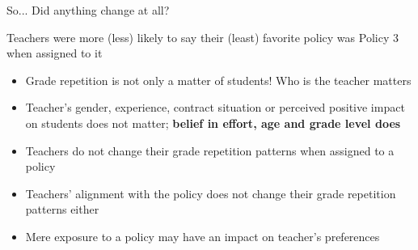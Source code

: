 \documentclass{beamer}
\newcommand{\tabpath}{../../3. Output/tables/}
\begin{document}
	\begin{frame}
		So... Did anything change at all?
	\end{frame}
	
	\begin{frame}{Teachers were more (less) likely to say their (least) favorite policy was Policy 3 when assigned to it}
		\tiny
		\begin{table}
			 
		\end{table}
	\end{frame}
	
	\begin{frame}
		\begin{itemize}
			\item Grade repetition is not only a matter of students! Who is the teacher matters
			\item Teacher's gender, experience, contract situation or perceived positive impact on students does not matter; \textbf{belief in effort, age and grade level does}
			\item Teachers do not change their grade repetition patterns when assigned to a policy
			\item Teachers' alignment with the policy does not change their grade repetition patterns either
			\item Mere exposure to a policy may have an impact on teacher's preferences
		\end{itemize}
	\end{frame}
	
\end{document}
